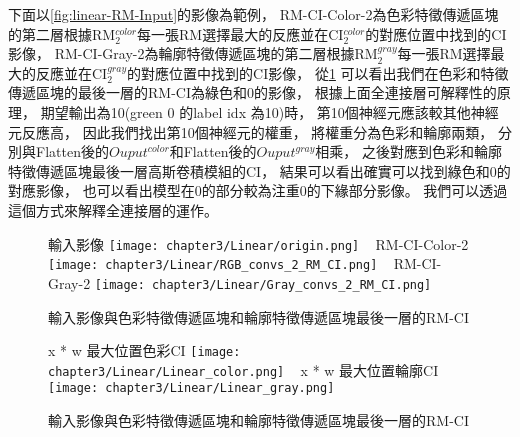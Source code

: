 \documentclass[class=NCU_thesis, crop=false]{standalone}
\begin{document}
下面以\cref{fig:linear-RM-Input}的影像為範例，
RM-CI-Color-2為色彩特徵傳遞區塊的第二層根據RM$^{color}_{2}$每一張RM選擇最大的反應並在CI$^{color}_{2}$的對應位置中找到的CI影像，
RM-CI-Gray-2為輪廓特徵傳遞區塊的第二層根據RM$^{gray}_{2}$每一張RM選擇最大的反應並在CI$^{gray}_{2}$的對應位置中找到的CI影像，
從\cref{fig:RM-CI}  可以看出我們在色彩和特徵傳遞區塊的最後一層的RM-CI為綠色和0的影像，
根據上面全連接層可解釋性的原理，
期望輸出為10(green 0 的label idx 為10)時，
第10個神經元應該較其他神經元反應高，
因此我們找出第10個神經元的權重，
將權重分為色彩和輪廓兩類，
分別與Flatten後的$Ouput^{color}$和Flatten後的$Ouput^{gray}$相乘，
之後對應到色彩和輪廓特徵傳遞區塊最後一層高斯卷積模組的CI，
結果可以看出確實可以找到綠色和0的對應影像，
也可以看出模型在0的部分較為注重0的下緣部分影像。
我們可以透過這個方式來解釋全連接層的運作。

\begin{figure}[H]
    \centering
    \subcaptionbox
        {輸入影像
        \label{fig:linear-RM-Input}}
        {\texttt{[image: chapter3/Linear/origin.png]}}
    ~
    \subcaptionbox
        {RM-CI-Color-2
        \label{fig:linear-RM-CI-color-2}}
        {\texttt{[image: chapter3/Linear/RGB\_convs\_2\_RM\_CI.png]}}
    ~
    \subcaptionbox
        {RM-CI-Gray-2
        \label{fig:linear-RM-CI-gray-2}}
        {\texttt{[image: chapter3/Linear/Gray\_convs\_2\_RM\_CI.png]}}
    \caption{輸入影像與色彩特徵傳遞區塊和輪廓特徵傳遞區塊最後一層的RM-CI\cite{YangCNNInterpretable}}
    \label{fig:RM-CI}
\end{figure}

\begin{figure}[H]
    \centering
    \subcaptionbox
        {x * w 最大位置色彩CI
        \label{fig:linear-rgb}}
        {\texttt{[image: chapter3/Linear/Linear\_color.png]}}
    ~
    \subcaptionbox
        {x * w 最大位置輪廓CI
        \label{fig:linear-gray}}
        {\texttt{[image: chapter3/Linear/Linear\_gray.png]}}
    \caption{輸入影像與色彩特徵傳遞區塊和輪廓特徵傳遞區塊最後一層的RM-CI\cite{YangCNNInterpretable}}
    \label{fig:Linear-w-x}
\end{figure}
\end{document}
